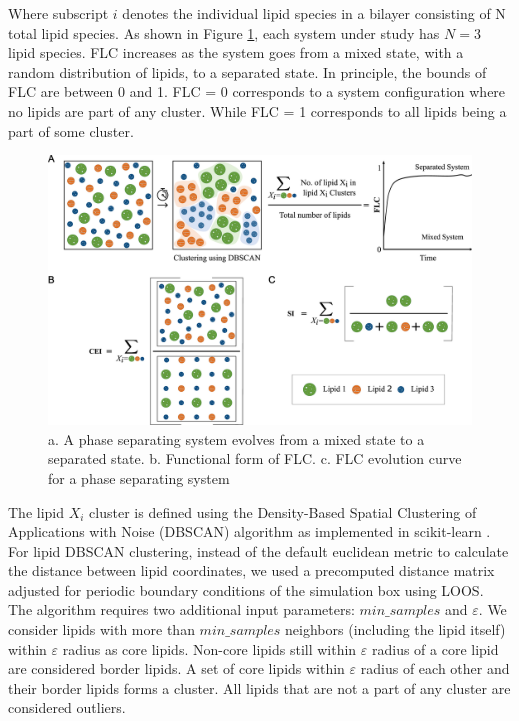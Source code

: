 \documentclass{biophys-new}
\begin{document}
Where subscript $i$ denotes the individual lipid species in a bilayer consisting of N total lipid species.
As shown in Figure \ref{fig2:view}, each system under study has $N=3$ lipid species.
FLC increases as the system goes from a mixed state, with a random distribution of lipids, to a separated state.
In principle, the bounds of FLC are between 0 and 1.
FLC = 0 corresponds to a system configuration where no lipids are part of any cluster.
While FLC = 1 corresponds to all lipids being a part of some cluster. 


\begin{figure}[hbt!]
\centering
\includegraphics[width=1\linewidth]{Figures/Main/2/placeholder.jpg}
\caption{a. A phase separating system evolves from a mixed state to a separated state. b. Functional form of FLC. c. FLC evolution curve for a phase separating system}
\label{fig2:view}
\end{figure}


The lipid $X_i$ cluster is defined using the Density-Based Spatial Clustering of Applications with Noise (DBSCAN) algorithm \cite{MartinEsterHans-PeterKriegelJiirgSander1996, Ester2017} as implemented in scikit-learn \cite{PedregosaF.VaroquauxG.GramfortA.MichelV.ThirionB.GriselO.BlondelM.PrettenhoferP.WeissR.andDubourgV.VanderplasJ.PassosA.CournapeauD.BrucherM.PerrotM.Duchesnay2011}.
For lipid DBSCAN clustering, instead of the default euclidean metric to calculate the distance between lipid coordinates, we used a precomputed distance matrix adjusted for periodic boundary conditions of the simulation box using LOOS.
The algorithm requires two additional input parameters: $min\_samples$ and $\varepsilon$.
We consider lipids with more than $min\_samples$ neighbors (including the lipid itself) within $\varepsilon$ radius as core lipids.
Non-core lipids still within $\varepsilon$ radius of a core lipid are considered border lipids.
A set of core lipids within $\varepsilon$ radius of each other and their border lipids forms a cluster.
All lipids that are not a part of any cluster are considered outliers.
\end{document}
